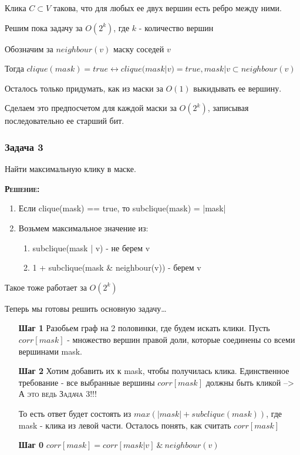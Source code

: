 \begin{definition}
  Клика $C \subset V$ такова, что для любых ее двух вершин есть ребро между ними.
\end{definition}

Решим пока задачу за $O(2^k)$, где $k$ - количество вершин

Обозначим за $neighbour(v)$ маску соседей $v$

Тогда $clique(mask) = true \leftrightarrow clique(mask | v) = true, mask | v \subset neighbour(v)$

Осталось только придумать, как из маски за $O(1)$ выкидывать ее вершину.

Сделаем это предпосчетом для каждой маски за $O(2^k)$, записывая последовательно  ее старший бит.

\newpage 
\subsubsection{Задача 3} Найти максимальную клику в маске. 

\textsc{\textbf{Решение:}}

\begin{enumerate}
  \item Если clique(mask) == true, то subclique(mask) = |mask|
  \item Возьмем максимальное значение из:\begin{enumerate}
    \item subclique(mask | v) - не берем v
    \item 1 + subclique(mask \& neighbour(v)) - берем v
  \end{enumerate}
\end{enumerate}

Такое тоже работает за $O(2^k)$
 
Теперь мы готовы решить основную задачу\dots

\begin{enumerate}
  \item [\textbf{Шаг 1}] Разобьем граф на 2 половинки, где будем искать клики. Пусть $corr[mask]$ - множество вершин правой доли, которые соединены со всеми вершинами mask.
  \item [\textbf{Шаг 2}] Хотим добавить их к mask, чтобы получилась клика. Единственное требование - все выбранные вершины $corr[mask]$ должны быть кликой --> \textsc{А это ведь Задача 3!!!}

То есть ответ будет состоять из $max (|mask| + subclique(mask))$, где mask - клика из левой части. Осталось понять, как считать $corr[mask]$
\item[\textbf{Шаг 0}] $corr[mask] = corr[mask | v] \ \& \ neighbour(v)$
\end{enumerate}


